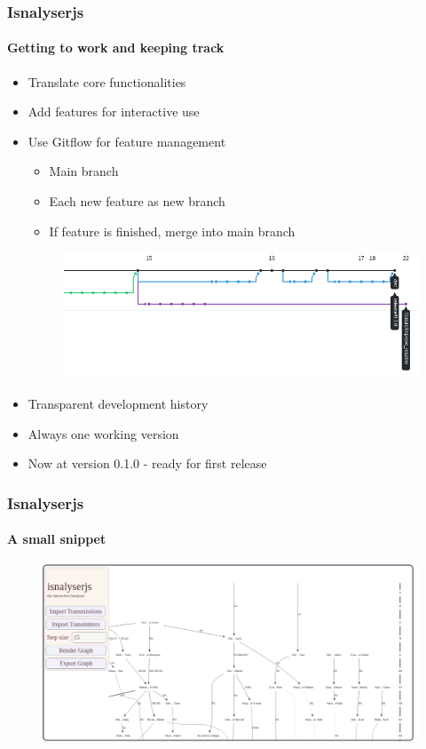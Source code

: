 \documentclass[9pt]{beamer}
\begin{document}
\begin{frame}
\frametitle{Isnalyserjs}
\framesubtitle{Getting to work and keeping track}
\begin{itemize}%
	\item Translate core functionalities
	\item Add features for interactive use
	\item Use Gitflow for feature management
	\begin{itemize}
		\item Main branch
		\item Each new feature as new branch
		\item If feature is finished, merge into main branch 
	\end{itemize}
	\begin{figure}
	\flushleft
	\includegraphics[width=.7\linewidth]{figures/git.png}
\end{figure}
	\item Transparent development history
	\item Always one working version
	\item Now at version 0.1.0 - ready for first release
	
\end{itemize}
\end{frame}



\begin{frame}
\frametitle{Isnalyserjs}
\framesubtitle{A small snippet}
	\begin{figure}
	\flushleft
	\includegraphics[width=1.1\linewidth]{figures/isnalyser_screenshot.pdf}
\end{figure}
\end{frame}
\end{document}
